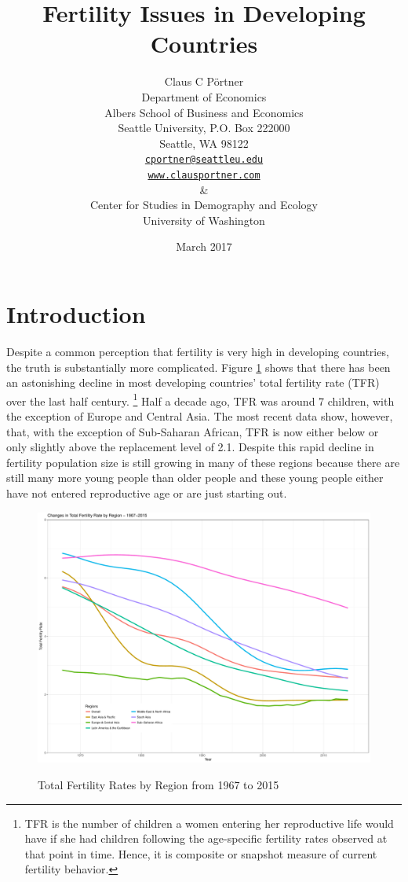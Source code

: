 \documentclass[letterpaper,12pt]{article}
\title{Fertility Issues in Developing Countries}
\author{Claus C P\"ortner\\
    Department of Economics\\
    Albers School of Business and Economics\\
    Seattle University, P.O. Box 222000\\
    Seattle, WA 98122\\
    \href{mailto:cportner@seattleu.edu}{\texttt{cportner@seattleu.edu}}\\
    \href{http://www.clausportner.com}{\texttt{www.clausportner.com}}\\
    \& \\
    Center for Studies in Demography and Ecology \\
    University of Washington\\ \vspace{2cm}
    }
\date{March 2017}
\begin{document}
\graphicspath{{../figures/}}

\maketitle
\thispagestyle{empty}


\newpage

\section{Introduction}

Despite a common perception that fertility is very high in developing countries,
the truth is substantially more complicated.
Figure \ref{fig:TFR} shows that there has been an astonishing decline in 
most developing countries' total fertility rate (TFR) over the last half 
century.%
\footnote{
TFR is the number of children a women entering her reproductive life
would have if she had children following the age-specific fertility
rates observed at that point in time.
Hence, it is composite or snapshot measure of current fertility
behavior.
}
Half a decade ago, TFR was around 7 children, with the exception
of Europe and Central Asia.
The most recent data show, however, that, with the exception of 
Sub-Saharan African, TFR is now either below or only slightly 
above the replacement level of 2.1.
Despite this rapid decline in fertility population size is still
growing in many of these regions because there are still many
more young people than older people and these young people either
have not entered reproductive age or are just starting out.

\begin{figure}[hp]
    \centering
    \caption{Total Fertility Rates by Region from 1967 to 2015}
    \includegraphics[width=0.75\linewidth]{totalFertilityRates}
    \label{fig:TFR}
\end{figure}
\end{document}
